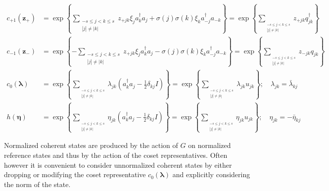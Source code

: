 \documentclass[aps,preprint]{revtex4}%
\begin{document}
\begin{align}
c_{+1}\left(  \mathbf{z}_{+}\right)   &  =\exp\left\{  \sum
\limits_{\substack{-s\leq j<k\leq s\\\left\vert j\right\vert \neq\left\vert
k\right\vert }}z_{+jk}\xi_{j}a_{k}^{\dagger}a_{j}+\sigma\left(  j\right)
\sigma\left(  k\right)  \xi_{k}a_{-j}^{\dagger}a_{-k}\right\}  =\exp\left\{
\sum\limits_{_{\substack{-s\leq j<k\leq s\\\left\vert j\right\vert
\neq\left\vert k\right\vert }}}z_{+jk}q_{jk}^{\dagger}\right\} \\
c_{-1}\left(  \mathbf{z}_{-}\right)   &  =\exp\left\{  -\sum
\limits_{\substack{-s\leq j<k\leq s\\\left\vert j\right\vert \neq\left\vert
k\right\vert }}z_{+jk}\xi_{j}a_{k}^{\dagger}a_{j}-\sigma\left(  j\right)
\sigma\left(  k\right)  \xi_{k}a_{-j}^{\dagger}a_{-k}\right\}  =\exp\left\{
\sum\limits_{_{\substack{-s\leq j<k\leq s\\\left\vert j\right\vert
\neq\left\vert k\right\vert }}}z_{-jk}q_{jk}\right\} \\
c_{0}\left(  \mathbf{\lambda}\right)   &  =\exp\left\{  \sum
\limits_{_{\substack{-s\leq j<k\leq s\\\left\vert j\right\vert \neq\left\vert
k\right\vert }}}\lambda_{jk}\left(  a_{k}^{\dagger}a_{j}-\frac{1}{2}%
\delta_{kj}I\right)  \right\}  =\exp\left\{  \sum\limits_{_{\substack{-s\leq
j<k\leq s\\\left\vert j\right\vert \neq\left\vert k\right\vert }}}\lambda
_{jk}u_{jk}\right\}  ;\quad\lambda_{jk}=\bar{\lambda}_{kj}\\
h\left(  \mathbf{\eta}\right)   &  =\exp\left\{  \sum
\limits_{_{\substack{-s\leq j<k\leq s\\\left\vert j\right\vert \neq\left\vert
k\right\vert }}}\eta_{jk}\left(  a_{k}^{\dagger}a_{j}-\frac{1}{2}\delta
_{kj}I\right)  \right\}  =\exp\left\{  \sum\limits_{_{\substack{-s\leq j<k\leq
s\\\left\vert j\right\vert \neq\left\vert k\right\vert }}}\eta_{jk}%
u_{jk}\right\}  ;\quad\eta_{jk}=-\bar{\eta}_{kj}%
\end{align}


Normalized coherent states are produced by the action of $G$ on normalized
reference states and thus by the action of the coset representatives. Often
however it is convenient to consider unnormalized coherent states by either
dropping or modifying the coset representative $c_{0}\left(  \mathbf{\lambda
}\right)  $ and explicitly considering the norm of the state.
\end{document}
